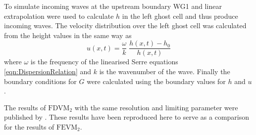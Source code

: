 To simulate incoming waves at the upstream boundary WG1 and linear extrapolation were used to calculate $h$ in the left ghost cell and thus produce incoming waves. The velocity distribution over the left ghost cell was calculated from the height values in the same way as \citet{Beji-Battjes-1994-1}
\begin{equation*}
u(x,t) = \frac{\omega}{k} \; \dfrac{h(x,t) - h_0}{h(x,t)}
\end{equation*}
where $\omega$ is the frequency of the linearised Serre equations \eqref{eqn:DispersionRelation} and $k$ is the wavenumber of the wave. Finally the boundary conditions for $G$ were calculated using the boundary values for $h$ and $u$. 

The results of $\text{FDVM}_2$ with the same resolution and limiting parameter were published by \citet{Zoppou-etal-2017}. These results have been reproduced here to serve as a comparison for the results of $\text{FEVM}_2$. 
%
